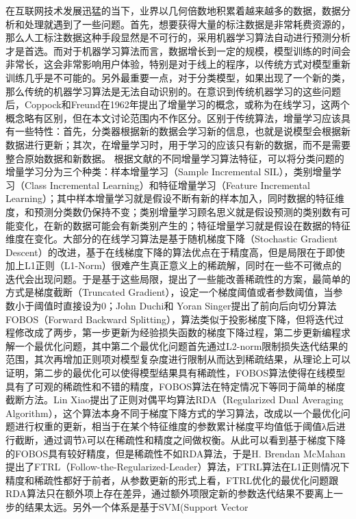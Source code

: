在互联网技术发展迅猛的当下，业界以几何倍数地积累着越来越多的数据，数据分析和处理就遇到了一些问题。首先，想要获得大量的标注数据是非常耗费资源的，那么人工标注数据这种手段显然是不可行的，采用机器学习算法自动进行预测分析才是首选。而对于机器学习算法而言，数据增长到一定的规模，模型训练的时间会非常长，这会非常影响用户体验，特别是对于线上的程序，以传统方式对模型重新训练几乎是不可能的。另外最重要一点，对于分类模型，如果出现了一个新的类，那么传统的机器学习算法是无法自动识别的。在意识到传统机器学习的这些问题后，Coppock和Freund在1962年提出了增量学习的概念\cite{coppock1962all}，或称为在线学习，这两个概念略有区别，但在本文讨论范围内不作区分。区别于传统算法，增量学习应该具有一些特性：首先，分类器根据新的数据会学习新的信息，也就是说模型会根据新数据进行更新；其次，在增量学习时，用于学习的应该只有新的数据，而不是需要整合原始数据和新数据。 根据文献的不同增量学习算法特征，可以将分类问题的增量学习分为三个种类：样本增量学习（Sample Incremental SIL），类别增量学习（Class Incremental Learning）和特征增量学习（Feature Incremental Learning）\cite{zhong2017survey}；其中样本增量学习就是假设不断有新的样本加入，同时数据的特征维度，和预测分类数仍保持不变；类别增量学习顾名思义就是假设预测的类别数有可能变化，在新的数据可能会有新类别产生的；特征增量学习就是假设在数据的特征维度在变化。大部分的在线学习算法是基于随机梯度下降（Stochastic Gradient Descent）的改进\cite{hazan2007logarithmic, xiao2010dual, mcmahan2011follow}，基于在线梯度下降的算法优点在于精度高，但是局限在于即使加上L1正则（L1-Norm）很难产生真正意义上的稀疏解，同时在一些不可微点的迭代会出现问题。于是基于这些局限，提出了一些能改善稀疏性的方案，最简单的方式是梯度截断（Truncated Gradient），设定一个梯度阈值或者参数阈值，当参数小于阈值时直接设为0；John Duchi和 Yoran Singer\cite{duchi2009efficient}提出了前向后向切分算法FOBOS（Forward Backward Splitting），算法类似于投影梯度下降，但将迭代过程修改成了两步，第一步更新为经验损失函数的梯度下降过程，第二步更新编程求解一个最优化问题，其中第二个最优化问题首先通过L2-norm限制损失迭代结果的范围，其次再增加正则项对模型复杂度进行限制从而达到稀疏结果，从理论上可以证明，第二步的最优化可以使得模型结果具有稀疏性，FOBOS算法使得在线模型具有了可观的稀疏性和不错的精度，FOBOS算法在特定情况下等同于简单的梯度截断方法。Lin Xiao\cite{xiao2010dual}提出了正则对偶平均算法RDA（Regularized Dual Averaging Algorithm），这个算法本身不同于梯度下降方式的学习算法，改成以一个最优化问题进行权重的更新，相当于在某个特征维度的参数累计梯度平均值低于阈值λ后进行截断，通过调节λ可以在稀疏性和精度之间做权衡。从此可以看到基于梯度下降的FOBOS具有较好精度，但是稀疏性不如RDA算法，于是H. Brendan McMahan提出了FTRL（Follow-the-Regularized-Leader）算法\cite{mcmahan2011follow}，FTRL算法在L1正则情况下精度和稀疏性都好于前者，从参数更新的形式上看，FTRL优化的最优化问题跟RDA算法只在额外项上存在差异，通过额外项限定新的参数迭代结果不要离上一步的结果太远。另外一个体系是基于SVM(Support Vector 